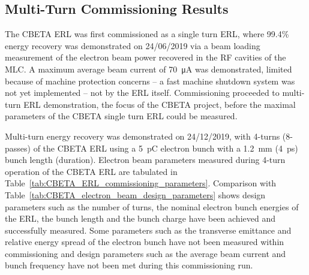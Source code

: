 \documentclass[../main.tex]{subfiles}
\begin{document}
\subsection{Multi-Turn Commissioning Results}

The CBETA ERL was first commissioned as a single turn ERL, where 99.4\% energy recovery was demonstrated \cite{gulliford2021measurement} on 24/06/2019 via a beam loading measurement of the electron beam power recovered in the RF cavities of the MLC. A maximum average beam current of 70~\si{\micro\ampere} was demonstrated, limited because of machine protection concerns -- a fast machine shutdown system was not yet implemented -- not by the ERL itself. Commissioning proceeded to multi-turn ERL demonstration, the focus of the CBETA project, before the maximal parameters of the CBETA single turn ERL could be measured.

Multi-turn energy recovery was demonstrated \cite{bartnik2020cbeta} on 24/12/2019, with 4-turns (8-passes) of the CBETA ERL using a 5~\si{\pico\coulomb} electron bunch with a 1.2~\si{\milli\meter} (4~\si{\pico\second}) bunch length (duration). Electron beam parameters measured during 4-turn operation of the CBETA ERL are tabulated in Table~\ref{tab:CBETA_ERL_commissioning_parameters}. Comparison with Table~\ref{tab:CBETA_electron_beam_design_parameters} shows design parameters such as the number of turns, the nominal electron bunch energies of the ERL, the bunch length and the bunch charge have been achieved and successfully measured. Some parameters such as the transverse emittance and relative energy spread of the electron bunch have not been measured within commissioning and design parameters such as the average beam current and bunch frequency have not been met during this commissioning run.
\end{document}
